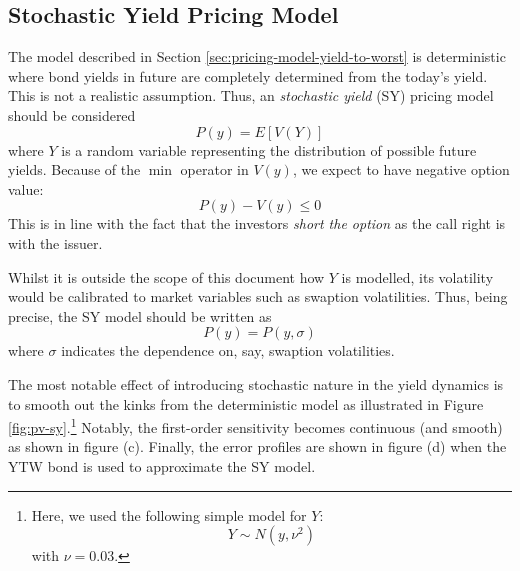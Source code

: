 \documentclass[10pt,a4paper]{article}
\begin{document}
\subsection{Stochastic Yield Pricing Model}
\label{sec:pricing-model-stochstic-yield}

The model described in Section \ref{sec:pricing-model-yield-to-worst} is deterministic where bond yields in future are completely determined from the today's yield. This is not a realistic assumption. Thus, an {\em stochastic yield} (SY) pricing model should be considered
\begin{equation}
P(y) = E\left[ V(Y) \right]
\end{equation}
where $Y$ is a random variable representing the distribution of possible future yields. Because of the $\min$ operator in $V(y)$, we expect to have negative option value: 
\begin{equation}
P(y) - V(y) \le 0
\label{eqn:option-value}
\end{equation}
This is in line with the fact that the investors {\em short the option} as the call right is with the issuer. 

Whilst it is outside the scope of this document how $Y$ is modelled, its volatility would be calibrated to market variables such as swaption volatilities. Thus, being precise, the SY model should be written as
\begin{equation}
P(y) = P(y, \sigma)
\end{equation}
where $\sigma$ indicates the dependence on, say, swaption volatilities. 

The most notable effect of introducing stochastic nature in the yield dynamics is to smooth out the kinks from the deterministic model as illustrated in Figure \ref{fig:pv-sy}.\footnote{Here, we used the following simple model for $Y$:
\begin{equation}
Y \sim N(y, \nu^2)
\end{equation}
with $\nu = 0.03$.}
Notably, the first-order sensitivity becomes continuous (and smooth) as shown in figure (c). Finally, the error profiles are shown in figure (d) when the YTW bond is used to approximate the SY model. 
\end{document}
